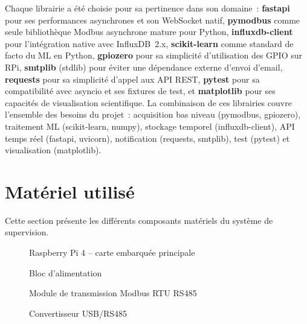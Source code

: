 Chaque librairie a été choisie pour sa pertinence dans son domaine~: \textbf{fastapi} pour ses performances asynchrones et son WebSocket natif, \textbf{pymodbus} comme seule bibliothèque Modbus asynchrone mature pour Python, \textbf{influxdb-client} pour l'intégration native avec InfluxDB~2.x, \textbf{scikit-learn} comme standard de facto du ML en Python, \textbf{gpiozero} pour sa simplicité d'utilisation des GPIO sur RPi, \textbf{smtplib} (stdlib) pour éviter une dépendance externe d'envoi d'email, \textbf{requests} pour sa simplicité d'appel aux API REST, \textbf{pytest} pour sa compatibilité avec asyncio et ses fixtures de test, et \textbf{matplotlib} pour ses capacités de visualisation scientifique. La combinaison de ces librairies couvre l'ensemble des besoins du projet~: acquisition bas niveau (pymodbus, gpiozero), traitement ML (scikit-learn, numpy), stockage temporel (influxdb-client), API temps réel (fastapi, uvicorn), notification (requests, smtplib), test (pytest) et visualisation (matplotlib).

\section{Matériel utilisé}

Cette section présente les différents composants matériels du système de supervision.

\begin{figure}[htbp]
  \centering
  \caption{Raspberry Pi 4 -- carte embarquée principale}
  \label{fig:rpi4}
\end{figure}

\begin{figure}[htbp]
  \centering
  \caption{Bloc d'alimentation}
  \label{fig:alimentation}
\end{figure}

\begin{figure}[htbp]
  \centering
  \caption{Module de transmission Modbus RTU RS485}
  \label{fig:module_rs485}
\end{figure}

\begin{figure}[htbp]
  \centering
  \caption{Convertisseur USB/RS485}
  \label{fig:usb_rs485}
\end{figure}

